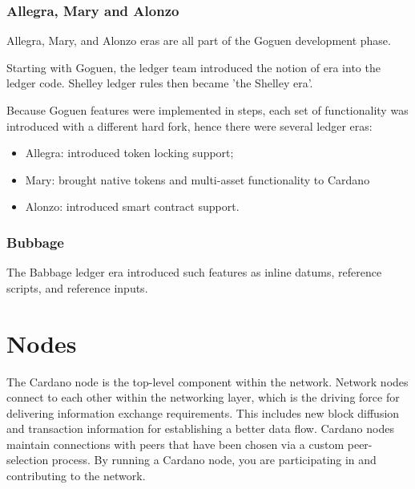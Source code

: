 \vspace{0.5cm}

\subsubsection{Allegra, Mary and Alonzo}

Allegra, Mary, and Alonzo eras are all part of the Goguen development phase.

\vspace{0.2cm}

\noindent
Starting with Goguen, the ledger team introduced the notion of era into the ledger code. 
Shelley ledger rules then became 'the Shelley era'.

\vspace{0.2cm}

\noindent
Because Goguen features were implemented in steps, each set of functionality was introduced 
with a different hard fork, hence there were several ledger eras:
\begin{itemize}
    \item Allegra: introduced token locking support;
    \item Mary: brought native tokens and multi-asset functionality to Cardano
    \item Alonzo: introduced smart contract support.
\end{itemize}

\vspace{0.2cm}

\subsubsection{Bubbage}

The Babbage ledger era introduced such features as inline datums, reference scripts, and 
reference inputs.

\vspace{0.5cm}

\section{Nodes}

The Cardano node is the top-level component within the network. Network nodes connect to 
each other within the networking layer, which is the driving force for delivering 
information exchange requirements. This includes new block diffusion and transaction 
information for establishing a better data flow. Cardano nodes maintain connections 
with peers that have been chosen via a custom peer-selection process. By running a 
Cardano node, you are participating in and contributing to the network.

